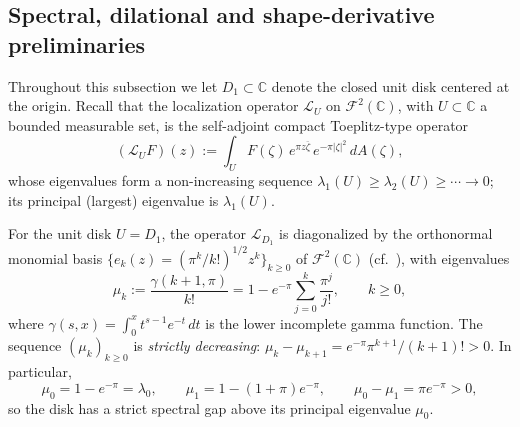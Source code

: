 \documentclass[a4paper,11pt,reqno]{amsart}
\numberwithin{equation}{section}
\theoremstyle{plain} %
\theoremstyle{definition} %
\theoremstyle{remark}
\newcommand{\C}{\mathbb{C}}
\begin{document}
\subsection{Spectral, dilational and shape-derivative preliminaries}
\label{subsec:GGRT-preliminaries}

Throughout this subsection we let \(D_1\subset \C\) denote the closed unit
disk centered at the origin. Recall that the localization operator
\(\mathcal L_U\) on \(\mathcal F^2(\C)\), with \(U\subset \C\) a bounded
measurable set, is the self-adjoint compact Toeplitz-type operator
\[
(\mathcal L_U F)(z)
:=
\int_U F(\zeta)\,e^{\pi z\overline\zeta}\,e^{-\pi|\zeta|^2}\,dA(\zeta),
\]
whose eigenvalues form a non-increasing sequence
\(\lambda_1(U)\ge \lambda_2(U)\ge\cdots\to 0\); its principal (largest)
eigenvalue is \(\lambda_1(U)\).

For the unit disk \(U=D_1\), the operator \(\mathcal L_{D_1}\) is diagonalized
by the orthonormal monomial basis
\(\{e_k(z)=(\pi^k/k!)^{1/2}z^k\}_{k\ge 0}\) of \(\mathcal F^2(\C)\)
(cf.~\cite{Daubechies}), with eigenvalues
\begin{equation}\label{eq:disk-eigenvalues-explicit}
\mu_k:=\frac{\gamma(k+1,\pi)}{k!}
=
1-e^{-\pi}\sum_{j=0}^{k}\frac{\pi^j}{j!},
\qquad k\ge 0,
\end{equation}
where \(\gamma(s,x)=\int_0^x t^{s-1}e^{-t}\,dt\) is the lower incomplete gamma
function. The sequence \((\mu_k)_{k\ge 0}\) is \emph{strictly decreasing}:
\(\mu_k-\mu_{k+1}=e^{-\pi}\pi^{k+1}/(k+1)!>0\). In particular,
\begin{equation}\label{eq:disk-spectral-gap}
\mu_0=1-e^{-\pi}=\lambda_0,
\qquad
\mu_1=1-(1+\pi)e^{-\pi},
\qquad
\mu_0-\mu_1=\pi e^{-\pi}>0,
\end{equation}
so the disk has a strict spectral gap above its principal eigenvalue
\(\mu_0\).

\medskip
\end{document}
